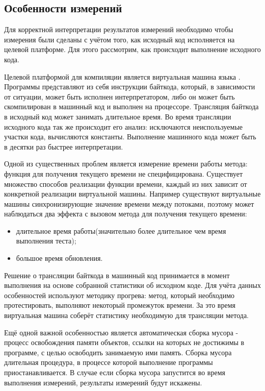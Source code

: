 
\subsection{Особенности измерений} \label{measurement_details}
Для корректной интерпретации результатов измерений необходимо чтобы измерения были сделаны с учётом того, как исходный код исполняется на целевой платформе. Для этого рассмотрим, как происходит выполнение исходного кода.

Целевой платформой для компиляции является виртуальная машина языка . Программы представляют из себя инструкции байткода, который, в зависимости от ситуации, может быть исполнен интерпретатором, либо он может быть скомпилирован в машинный код и выполнен на процессоре. Трансляция байткода в исходный код может занимать длительное время. Во время трансляции исходного кода так же происходит его анализ: исключаются неиспользуемые участки кода, вычисляются константы. Выполнение машинного кода может быть в десятки раз быстрее интерпретации.

Одной из существенных проблем является измерение времени работы метода: функция для получения текущего времени не специфицирована. Существует множество способов реализации функции времени, каждый из них зависит от конкретной реализации виртуальной машины. Например существуют виртуальные машины синхронизирующие значение времени между потоками, поэтому может наблюдаться два эффекта с вызовом метода для получения текущего времени:
\begin{itemize}
  \item длительное время работы(значительно более длительное чем время выполнения теста);
  \item большое время обновления.
\end{itemize}

Решение о трансляции байткода в машинный код принимается в момент выполнения на основе собранной статистики об исходном коде. Для учёта данных особенностей используют методику прогрева: метод, который необходимо протестировать, выполняют некоторый промежуток времени. За это время виртуальная машина соберёт статистику необходимую для трансляции метода.

Ещё одной важной особенностью является автоматическая сборка мусора - процесс освобождения памяти объектов, ссылки на которых не достижимы в программе, с целью освободить занимаемую ими память. Сборка мусора длительная процедура, в процессе которой выполнение программы приостанавливается. В случае если сборка мусора запустится во время выполнения измерений, результаты измерений будут искажены.

